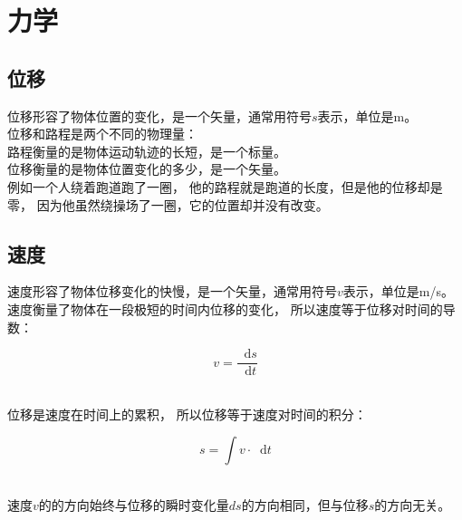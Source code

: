 \documentclass[UTF8]{ctexart}
\newcommand*{\dif}{\mathop{}\!\mathrm{d}}
\begin{document}
\newpage

\section{力学}

\subsection{位移}
    位移形容了物体位置的变化，是一个矢量，通常用符号$s$表示，单位是m。\\[3mm]
    位移和路程是两个不同的物理量：\\[1mm]
    路程衡量的是物体运动轨迹的长短，是一个标量。\\[1mm]
    位移衡量的是物体位置变化的多少，是一个矢量。\\[3mm]
    例如一个人绕着跑道跑了一圈，
    他的路程就是跑道的长度，但是他的位移却是零，
    因为他虽然绕操场了一圈，它的位置却并没有改变。

\subsection{速度}
    速度形容了物体位移变化的快慢，是一个矢量，通常用符号$v$表示，单位是m/s。\\[3mm]
    速度衡量了物体在一段极短的时间内位移的变化，
    所以速度等于位移对时间的导数：\\
    \begin{large}
        \begin{equation*}
            v=\frac{\dif s}{\dif t}
        \end{equation*}
    \end{large}\\
    位移是速度在时间上的累积，
    所以位移等于速度对时间的积分：\\
    \begin{large}
        \begin{equation*}
            s=\int v\cdot\dif t
        \end{equation*}
    \end{large}\\
    速度$v$的的方向始终与位移的瞬时变化量$ds$的方向相同，但与位移$s$的方向无关。
\end{document}
